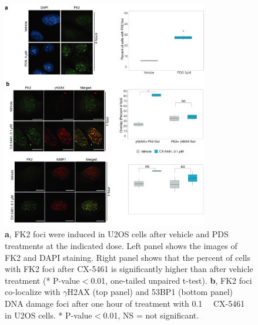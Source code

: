 \begin{figure}
    \centering
    \includegraphics[width=0.8\textwidth]{supplement/figures/Ub_signaling_foci.png}
    \caption
            {\textbf{a}, FK2 foci were induced in U2OS cells after vehicle and PDS treatments at the indicated dose. Left panel shows the images of FK2 and DAPI staining. Right panel shows that the percent of cells with FK2 foci after CX-5461 is significantly higher than after vehicle treatment (* P-value$<$0.01, one-tailed unpaired t-test).  
            \newline
            \textbf{b}, FK2 foci co-localize with $\gamma$H2AX (top panel) and 53BP1 (bottom panel) DNA damage foci  after one hour of treatment with \SI{0.1}{\micro\Molar} CX-5461 in U2OS cells. * P-value$<$0.01, NS = not significant. 
            }
        \label{sfig:ub-signaling}
\end{figure}

